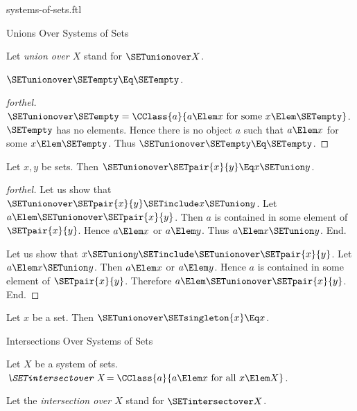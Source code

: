 \documentclass{stex}
\begin{document}
\begin{smodule}{systems-of-sets.ftl}
\begin{sfragment}{Unions Over Systems of Sets}
\begin{definition}[forthel,id=FOUNDATIONS_10_541772562300928]
    Let \emph{union over $X$} stand for $\SETunionover X$.
  \end{definition}

  \begin{proposition}[forthel,id=FOUNDATIONS_10_4872701241982976]
    $\SETunionover \SETempty \Eq \SETempty$.
  \end{proposition}
  \begin{proof}[forthel]
    $\SETunionover \SETempty = \CClass{a}{a \Elem x\text{ for some }x \Elem \SETempty}$.
    $\SETempty$ has no elements.
    Hence there is no object $a$ such that $a \Elem x$ for some $x \Elem \SETempty$.
    Thus $\SETunionover \SETempty \Eq \SETempty$.
  \end{proof}

  \begin{proposition}[forthel,id=FOUNDATIONS_10_2559541585641472]
    Let $x, y$ be sets.
    Then $\SETunionover \SETpair{x}{y} \Eq x \SETunion y$.
  \end{proposition}
  \begin{proof}[forthel]
    Let us show that $\SETunionover \SETpair{x}{y} \SETinclude x \SETunion y$.
      Let $a \Elem \SETunionover \SETpair{x}{y}$.
      Then $a$ is contained in some element of $\SETpair{x}{y}$.
      Hence $a \Elem x$ or $a \Elem y$.
      Thus $a \Elem x \SETunion y$.
    End.

    Let us show that $x \SETunion y \SETinclude \SETunionover \SETpair{x}{y}$.
      Let $a \Elem x \SETunion y$.
      Then $a \Elem x$ or $a \Elem y$.
      Hence $a$ is contained in some element of $\SETpair{x}{y}$.
      Therefore $a \Elem \SETunionover \SETpair{x}{y}$.
    End.
  \end{proof}

  \begin{corollary}[forthel,id=FOUNDATIONS_10_2157223832715264]
    Let $x$ be a set.
    Then $\SETunionover \SETsingleton{x} \Eq x$.
  \end{corollary}
\end{sfragment}

\begin{sfragment}{Intersections Over Systems of Sets}
  \begin{definition}[forthel,id=FOUNDATIONS_10_2659345095458816]
    Let $X$ be a system of sets.
    $\emph{\SETintersectover X} = \CClass{a}{a \Elem x\text{ for all }x \Elem X}$.

    Let the \emph{intersection over $X$} stand for $\SETintersectover X$.
  \end{definition}


\end{sfragment}
\end{smodule}
\end{document}
